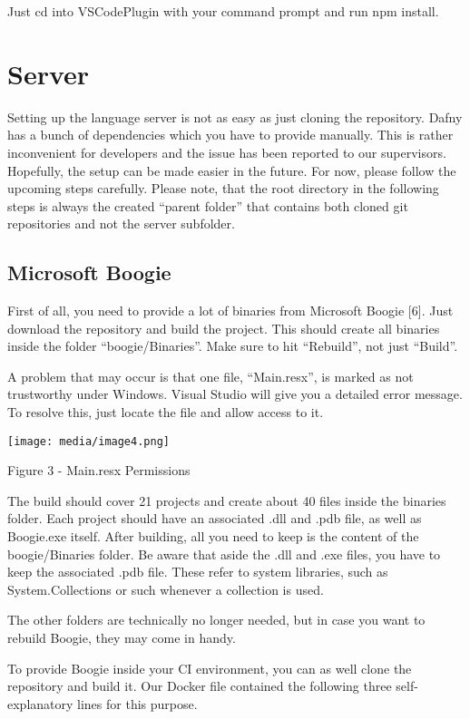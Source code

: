 \documentclass[]{book}
\begin{document}
Just cd into VSCodePlugin with your command prompt and run npm install.

\section{Server}\label{server}

Setting up the language server is not as easy as just cloning the repository. Dafny has a bunch of dependencies which you have to provide manually. This is rather inconvenient for developers and the issue has been reported to our supervisors. Hopefully, the setup can be made easier in the future. For now, please follow the upcoming steps carefully. Please note, that the root directory in the following steps is always the created ``parent folder'' that contains both cloned git repositories and not the server subfolder.

\subsection{Microsoft Boogie}\label{microsoft-boogie}

First of all, you need to provide a lot of binaries from Microsoft Boogie {[}6{]}. Just download the repository and build the project. This should create all binaries inside the folder ``boogie/Binaries''. Make sure to hit ``Rebuild'', not just ``Build''.

A problem that may occur is that one file, ``Main.resx'', is marked as not trustworthy under Windows. Visual Studio will give you a detailed error message. To resolve this, just locate the file and allow access to it.

\texttt{[image: media/image4.png]}

Figure 3 - Main.resx Permissions

The build should cover 21 projects and create about 40 files inside the binaries folder. Each project should have an associated .dll and .pdb file, as well as Boogie.exe itself. After building, all you need to keep is the content of the boogie/Binaries folder. Be aware that aside the .dll and .exe files, you have to keep the associated .pdb file. These refer to system libraries, such as System.Collections or such whenever a collection is used.

The other folders are technically no longer needed, but in case you want to rebuild Boogie, they may come in handy.

To provide Boogie inside your CI environment, you can as well clone the repository and build it. Our Docker file contained the following three self-explanatory lines for this purpose.
\end{document}

